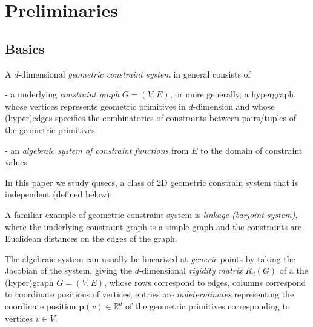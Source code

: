 \section{Preliminaries}
\label{sec:prelim}

\subsection{Basics}



A $d$-dimensional {\it geometric constraint system} in general consists of

- a underlying {\it constraint graph} $G=(V,E)$, or more generally, a hypergraph, whose  vertices represents geometric primitives in $d$-dimension and whose (hyper)edges specifies the combinatorics of constraints between pairs/tuples of the geometric primitives.

- an {\it algebraic system of  constraint functions} from $E$ to the domain of constraint values


In this paper we study qusecs, a class of 2D geometric constrain system that is independent (defined below).


A familiar example of geometric constraint system is {\it linkage (barjoint system)},
where the underlying constraint graph is a simple graph and
the constraints are Euclidean distances on the edges of the graph.





The algebraic system can usually be linearized at {\it generic} points
by taking the Jacobian of the system,
giving  the $d$-dimensional {\it rigidity matrix } $R_d(G)$ of a the (hyper)graph $G = (V,E)$, 
whose rows correspond to edges, columns correspond to coordinate positions of vertices,  entries are \emph{indeterminates} representing the coordinate position $\mathbf{p}(v) \in \mathbb{R}^d$ of the geometric primitives corresponding to vertices $v \in V$. 

